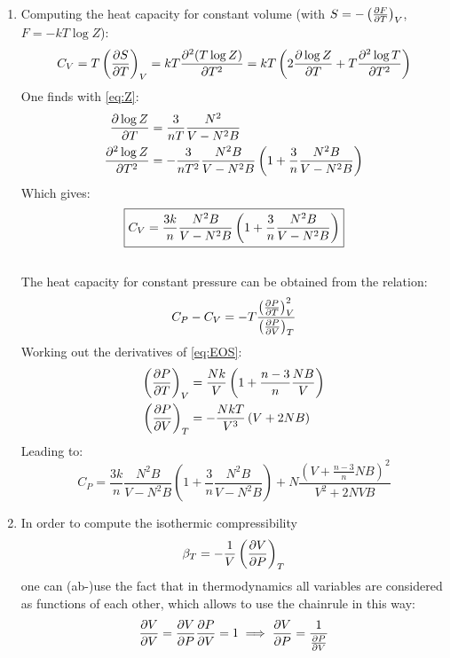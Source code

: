 \documentclass[11pt,a4paper]{scrartcl}
\newcommand{\thermpart}[3]{\left(\pdv{#1}{#2}\right)_{#3}}
\begin{document}
\begin{enumerate}[label=\textbf{\large(\alph*)}, itemsep=2\baselineskip]
\item
    Computing the heat capacity for constant volume (with
    $S=-\thermpart{F}{T}{V}$, $F=-kT\log{Z}$):
    \begin{equation*}
        C_{V}=T\thermpart{S}{T}{V}=kT\pdv[2]{(T\log{Z})}{T}
        =kT\left(2\pdv{\log{Z}}{T}+T\pdv[2]{\log{T}}{T}\right)
    \end{equation*}
    One finds with \eqref{eq:Z}:
    \begin{align*}
        \pdv{\log{Z}}{T}&=\frac{3}{nT}\frac{N^2}{V-N^2B} \\
        \pdv[2]{\log{Z}}{T}&=-\frac{3}{nT^2}\frac{N^2B}{V-N^2B}\left(1+\frac{3}{n}\frac{N^2B}{V-N^2B}\right)
    \end{align*}
    Which gives:
    \begin{equation}
        \boxed{%
        C_{V}=\frac{3k}{n}\frac{N^2B}{V-N^2B}\left(1+\frac{3}{n}\frac{N^2B}{V-N^2B}\right)}
        \label{eq:cv}
    \end{equation} \\

    The heat capacity for constant pressure can be obtained from the relation:
    \begin{equation*}
        C_{P}-C_{V}=-T\frac{\thermpart{P}{T}{V}^2}{\thermpart{P}{V}{T}}
    \end{equation*}
    Working out the derivatives of \eqref{eq:EOS}:
    \begin{align*}
        \thermpart{P}{T}{V}&=\frac{Nk}{V}\left(1+\frac{n-3}{n}\frac{NB}{V}\right)
        \\
        \thermpart{P}{V}{T}&=-\frac{NkT}{V^3}\left(V+2NB\right)
    \end{align*}
    Leading to:
    \begin{equation}
        C_{P}=\frac{3k}{n}\frac{N^2B}{V-N^2B}\left(1+\frac{3}{n}\frac{N^2B}{V-N^2B}\right)+N\frac{\left(V+\frac{n-3}{n}NB\right)^2}{V^2+2NVB}
        \label{eq:cp}
    \end{equation}


\item
    In order to compute the isothermic compressibility
    \begin{equation*}
        \beta_{T}=-\frac{1}{V}\thermpart{V}{P}{T}
    \end{equation*}
    one can (ab-)use the fact that in thermodynamics all variables are
    considered as functions of each other, which allows to use the chainrule in
    this way:
    \begin{equation*}
        \pdv{V}{V}=\pdv{V}{P}\pdv{P}{V}=1\implies\pdv{V}{P}=\frac{1}{\pdv{P}{V}}
    \end{equation*}


\end{enumerate}
\end{document}
